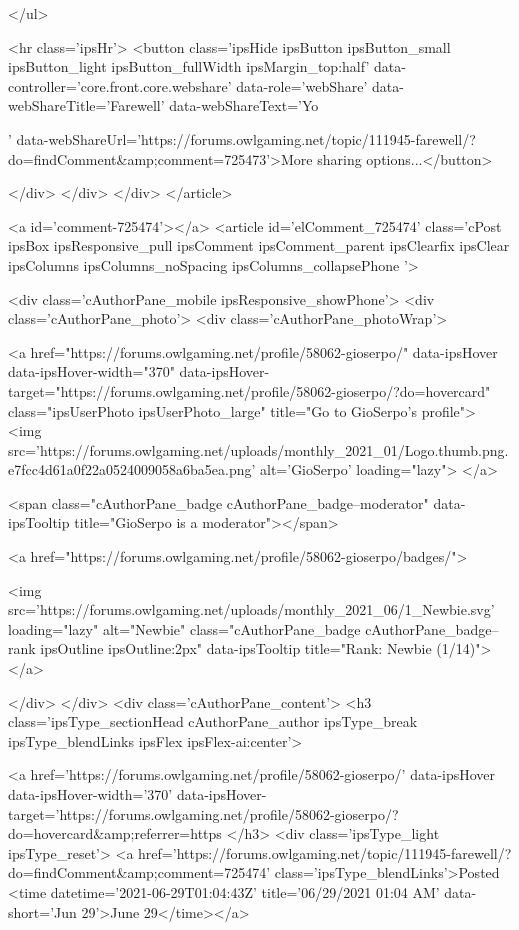 	</ul>


	<hr class='ipsHr'>
	<button class='ipsHide ipsButton ipsButton_small ipsButton_light ipsButton_fullWidth ipsMargin_top:half' data-controller='core.front.core.webshare' data-role='webShare' data-webShareTitle='Farewell' data-webShareText='Yo
 
' data-webShareUrl='https://forums.owlgaming.net/topic/111945-farewell/?do=findComment&amp;comment=725473'>More sharing options...</button>

	
</div>
</div>
	</div>
</article>
					
				
					
					
					



<a id='comment-725474'></a>
<article  id='elComment_725474' class='cPost ipsBox ipsResponsive_pull  ipsComment  ipsComment_parent ipsClearfix ipsClear ipsColumns ipsColumns_noSpacing ipsColumns_collapsePhone    '>
	

	

	<div class='cAuthorPane_mobile ipsResponsive_showPhone'>
		<div class='cAuthorPane_photo'>
			<div class='cAuthorPane_photoWrap'>
				


	<a href="https://forums.owlgaming.net/profile/58062-gioserpo/" data-ipsHover data-ipsHover-width="370" data-ipsHover-target="https://forums.owlgaming.net/profile/58062-gioserpo/?do=hovercard" class="ipsUserPhoto ipsUserPhoto_large" title="Go to GioSerpo's profile">
		<img src='https://forums.owlgaming.net/uploads/monthly_2021_01/Logo.thumb.png.e7fcc4d61a0f22a0524009058a6ba5ea.png' alt='GioSerpo' loading="lazy">
	</a>

				
				<span class="cAuthorPane_badge cAuthorPane_badge--moderator" data-ipsTooltip title="GioSerpo is a moderator"></span>
				
				
					<a href="https://forums.owlgaming.net/profile/58062-gioserpo/badges/">
						
<img src='https://forums.owlgaming.net/uploads/monthly_2021_06/1_Newbie.svg' loading="lazy" alt="Newbie" class="cAuthorPane_badge cAuthorPane_badge--rank ipsOutline ipsOutline:2px" data-ipsTooltip title="Rank: Newbie (1/14)">
					</a>
				
			</div>
		</div>
		<div class='cAuthorPane_content'>
			<h3 class='ipsType_sectionHead cAuthorPane_author ipsType_break ipsType_blendLinks ipsFlex ipsFlex-ai:center'>
				


<a href='https://forums.owlgaming.net/profile/58062-gioserpo/' data-ipsHover data-ipsHover-width='370' data-ipsHover-target='https://forums.owlgaming.net/profile/58062-gioserpo/?do=hovercard&amp;referrer=https%
			</h3>
			<div class='ipsType_light ipsType_reset'>
				<a href='https://forums.owlgaming.net/topic/111945-farewell/?do=findComment&amp;comment=725474' class='ipsType_blendLinks'>Posted <time datetime='2021-06-29T01:04:43Z' title='06/29/2021 01:04  AM' data-short='Jun 29'>June 29</time></a>
				
